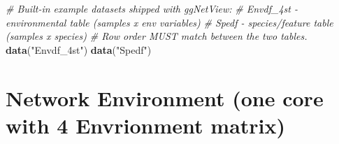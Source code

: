 \documentclass[
]{book}
\newenvironment{Shaded}{\begin{snugshade}}{\end{snugshade}}
\newcommand{\CommentTok}[1]{\textcolor[rgb]{0.56,0.35,0.01}{\textit{#1}}}
\newcommand{\FunctionTok}[1]{\textcolor[rgb]{0.13,0.29,0.53}{\textbf{#1}}}
\newcommand{\NormalTok}[1]{#1}
\newcommand{\StringTok}[1]{\textcolor[rgb]{0.31,0.60,0.02}{#1}}
\begin{document}
\begin{Shaded}
\begin{Highlighting}[]
\CommentTok{\# Built{-}in example datasets shipped with ggNetView:}
\CommentTok{\#   \textasciigrave{}Envdf\_4st\textasciigrave{} {-} environmental table (samples x env variables)}
\CommentTok{\#   \textasciigrave{}Spedf\textasciigrave{}     {-} species/feature table (samples x species)}
\CommentTok{\# Row order MUST match between the two tables.}
\FunctionTok{data}\NormalTok{(}\StringTok{"Envdf\_4st"}\NormalTok{)}
\FunctionTok{data}\NormalTok{(}\StringTok{"Spedf"}\NormalTok{)}
\end{Highlighting}
\end{Shaded}

\section{Network Environment (one core with 4 Envrionment matrix)}\label{network-environment-one-core-with-4-envrionment-matrix}
\end{document}
